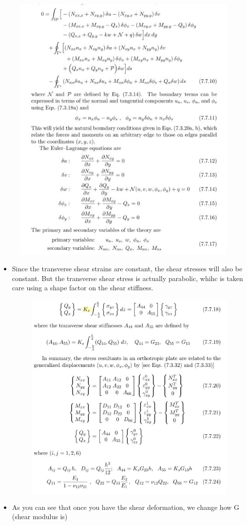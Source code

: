 	\begin{frame}
		\begin{figure}
			\centering
			\includegraphics[width=0.65\linewidth]{Figure/fig46}  		
		\end{figure}
	\end{frame}


	\begin{frame}
		\begin{itemize}
			\item Since the transverse shear strains are constant, the shear stresses will also be constant. But the transverse shear stress is actually parabolic, whihc is taken care using a shape factor on the shear stiffness. 
			\begin{figure}
				\centering
				\includegraphics[width=0.65\linewidth]{Figure/fig47}  		
			\end{figure}
			\item As you can see that once you have the shear deformation, we change how G (shear modulus is)
		\end{itemize}
	\end{frame}


